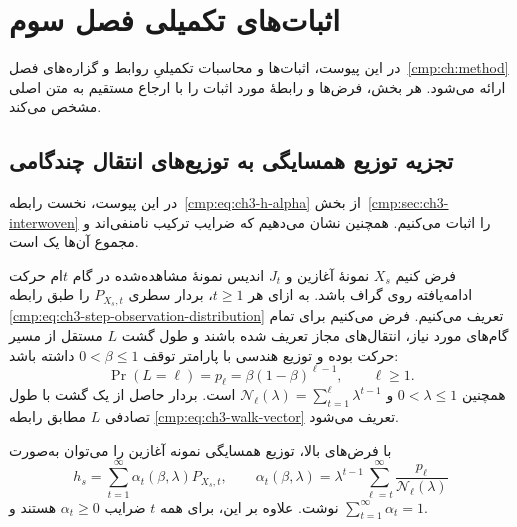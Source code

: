 \chapter{اثبات‌های تکمیلی فصل سوم}
\label{app:ch3-proofs}
در این پیوست، اثبات‌ها و محاسبات تکمیلیِ
روابط و گزاره‌های فصل~\ref{cmp:ch:method}
ارائه می‌شود. هر بخش، فرض‌ها و رابطهٔ مورد اثبات
را با ارجاع مستقیم به متن اصلی مشخص می‌کند.

\section{تجزیه توزیع همسایگی به توزیع‌های انتقال چندگامی}
\label{app:ch3-weighted-walk-proof}

در این پیوست، نخست رابطه~\eqref{cmp:eq:ch3-h-alpha} از بخش~\ref{cmp:sec:ch3-interwoven} را اثبات می‌کنیم. همچنین نشان می‌دهیم که ضرایب ترکیب نامنفی‌اند و مجموع آن‌ها یک است.

فرض کنیم $X_s$ نمونهٔ آغازین و $J_t$ اندیس نمونهٔ مشاهده‌شده در گام $t$ام حرکت ادامه‌یافته روی گراف باشد. به ازای هر $t\ge1$، بردار سطری $P_{X_s,t}$ را طبق رابطه \eqref{cmp:eq:ch3-step-observation-distribution} تعریف می‌کنیم. فرض می‌کنیم برای تمام گام‌های مورد نیاز، انتقال‌های مجاز تعریف شده باشند و طول گشت $L$ مستقل از مسیر حرکت بوده و توزیع هندسی با پارامتر توقف $0<\beta\le1$ داشته باشد:
\begin{equation}\label{eq:app-ch3-L}
\Pr(L=\ell)=p_\ell=\beta(1-\beta)^{\ell-1},\qquad \ell\ge1.
\end{equation}
همچنین $0<\lambda\le1$ و $\mathcal N_\ell(\lambda)=\sum_{t=1}^{\ell}\lambda^{t-1}$ است. بردار حاصل از یک گشت با طول تصادفی $L$ مطابق رابطه \eqref{cmp:eq:ch3-walk-vector} تعریف می‌شود.

\begin{proposition}\label{prop:app-ch3-alpha}
با فرض‌های بالا، توزیع همسایگی نمونه آغازین را می‌توان به‌صورت
\begin{equation}\label{eq:app-ch3-result}
h_s=\sum_{t=1}^{\infty}\alpha_t(\beta,\lambda)P_{X_s,t},
\qquad
\alpha_t(\beta,\lambda)=\lambda^{t-1}
\sum_{\ell=t}^{\infty}\frac{p_\ell}{\mathcal N_\ell(\lambda)}
\end{equation}
نوشت. علاوه بر این، برای همه $t$ ضرایب $\alpha_t\ge0$ هستند و $\sum_{t=1}^{\infty}\alpha_t=1$.
\end{proposition}

